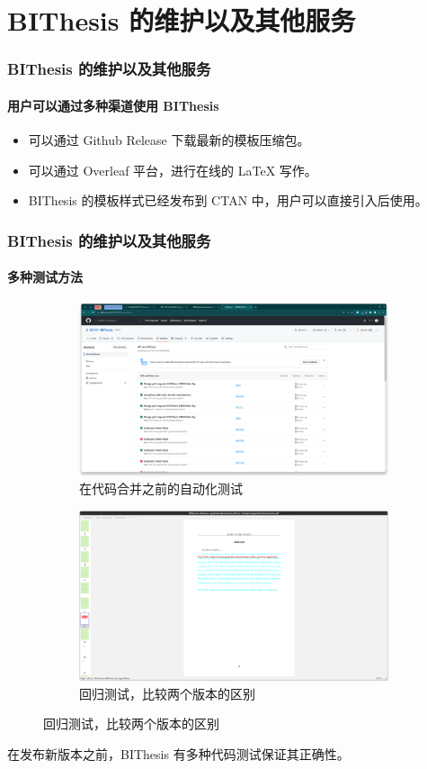 \documentclass[
  aspectratio=169,
  presentation,
  titlegraphic=./images/bit.png,
  framelogo=./images/bit.png
]{bitbeamer}
\begin{document}
\section{BIThesis 的维护以及其他服务}

\begin{frame}[t]
  \frametitle{BIThesis 的维护以及其他服务}
  \framesubtitle{用户可以通过多种渠道使用 BIThesis}

\begin{itemize}
  \item 可以通过 Github Release 下载最新的模板压缩包。
  \item 可以通过 Overleaf 平台，进行在线的 LaTeX 写作。
  \item BIThesis 的模板样式已经发布到 CTAN 中，用户可以直接引入后使用。 
\end{itemize}
\end{frame}

\begin{frame}[c]
  \frametitle{BIThesis 的维护以及其他服务}
  \framesubtitle{多种测试方法}

\begin{figure}
    \centering
    \begin{subfigure}{0.49\textwidth}
      \includegraphics[width=\textwidth]{images/2.png}
      \caption{在代码合并之前的自动化测试}\label{fig:1-1}
  \end{subfigure}
  \begin{subfigure}{0.49\textwidth}
      \includegraphics[width=\textwidth]{images/3.png}
      \caption{回归测试，比较两个版本的区别}\label{fig:1-2}
  \end{subfigure}
  \end{figure}
  
在发布新版本之前，BIThesis 有多种代码测试保证其正确性。
\end{frame}
\end{document}
